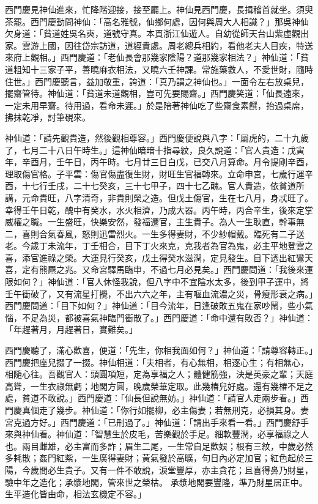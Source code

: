西門慶見神仙進來，忙降階迎接，接至廳上。神仙見西門慶，長揖稽首就坐。須臾茶罷。西門慶動問神仙：「高名雅號，仙鄉何處，因何與周大人相識？」那吳神仙欠身道：「貧道姓吳名奭，道號守真。本貫浙江仙遊人。自幼從師天台山紫虛觀出家。雲游上國，因往岱宗訪道，道經貴處。周老總兵相約，看他老夫人目疾，特送來府上觀相。」西門慶道：「老仙長會那幾家陰陽？道那幾家相法？」神仙道：「貧道粗知十三家子平，善曉麻衣相法，又曉六壬神課。常施藥救人，不愛世財，隨時住世。」西門慶聽言，益加敬重，誇道：「真乃謂之神仙也。」一面令左右放桌兒，擺齋管待。神仙道：「貧道未道觀相，豈可先要賜齋。」西門慶笑道：「仙長遠來，一定未用早齋。待用過，看命未遲。」於是陪著神仙吃了些齋食素饌，抬過桌席，拂抹乾凈，討筆硯來。

神仙道：「請先觀貴造，然後觀相尊容。」西門慶便說與八字：「屬虎的，二十九歲了，七月二十八日午時生。」這神仙暗暗十指尋紋，良久說道：「官人貴造：戊寅年，辛酉月，壬午日，丙午時。七月廿三日白戊，已交八月算命。月令提剛辛酉，理取傷官格。子平雲：傷官傷盡復生財，財旺生官福轉來。立命申宮，七歲行運辛酉，十七行壬戌，二十七癸亥，三十七甲子，四十七乙醜。官人貴造，依貧道所講，元命貴旺，八字清奇，非貴則榮之造。但戊土傷官，生在七八月，身忒旺了。幸得壬午日乾，醜中有癸水，水火相濟，乃成大器。丙午時，丙合辛生，後來定掌威權之職。一生盛旺，快樂安然，發福遷官，主生貴子。為人一生耿直，幹事無二，喜則合氣春風，怒則迅雷烈火。一生多得妻財，不少紗帽戴。臨死有二子送老。今歲丁未流年，丁壬相合，目下丁火來克，克我者為官為鬼，必主平地登雲之喜，添官進祿之榮。大運見行癸亥，戊土得癸水滋潤，定見發生。目下透出紅鸞天喜，定有熊羆之兆。又命宮驛馬臨申，不過七月必見矣。」西門慶問道：「我後來運限如何？」神仙道：「官人休怪我說，但八字中不宜陰水太多，後到甲子運中，將壬午衝破了，又有流星打攪，不出六六之年，主有嘔血流濃之災，骨瘦形衰之病。」西門慶問道：「目下如何？」神仙道：「目今流年，日逢破敗五鬼在家吵鬧，些小氣惱，不足為災，都被喜氣神臨門衝散了。」西門慶道：「命中還有敗否？」神仙道：「年趕著月，月趕著日，實難矣。」

西門慶聽了，滿心歡喜，便道：「先生，你相我面如何？」神仙道：「請尊容轉正。」西門慶把座兒掇了一掇。神仙相道：「夫相者，有心無相，相逐心生；有相無心，相隨心往。吾觀官人：頭圓項短，定為享福之人；體健筋強，決是英豪之輩；天庭高聳，一生衣祿無虧；地閣方圓，晚歲榮華定取。此幾椿兒好處。還有幾椿不足之處，貧道不敢說。」西門慶道：「仙長但說無妨。」神仙道：「請官人走兩步看。」西門慶真個走了幾步。神仙道：「你行如擺柳，必主傷妻；若無刑克，必損其身。妻宮克過方好。」西門慶道：「已刑過了。」神仙道：「請出手來看一看。」西門慶舒手來與神仙看。神仙道：「智慧生於皮毛，苦樂觀於手足。細軟豐潤，必享福祿之人也。兩目雌雄，必主富而多詐；眉生二尾，一生常自足歡娛；根有三紋，中歲必然多耗散；姦門紅紫，一生廣得妻財；黃氣發於高曠，旬日內必定加官；紅色起於三陽，今歲間必生貴子。又有一件不敢說，淚堂豐厚，亦主貪花；且喜得鼻乃財星，驗中年之造化；承漿地閣，管來世之榮枯。
承漿地閣要豐隆，準乃財星居正中。生平造化皆由命，相法玄機定不容。」

